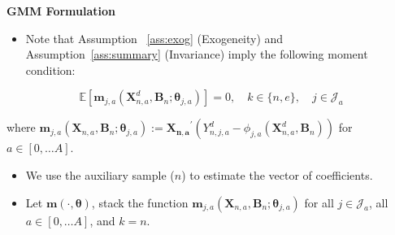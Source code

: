 \documentclass[static]{JJH-Beamer}
\begin{document}
\begin{frame}

\begin{center}
\textbf{GMM Formulation}
\end{center}

\begin{itemize}
\item Note that Assumption ~\ref{ass:exog} (Exogeneity) and Assumption~\ref{ass:summary} (Invariance) imply the following moment condition:
\end{itemize}

\begin{equation}
\mathbb{E} \left[ \bm{m}_{j,a} \left( \bm{X}_{n,a}^d, \bm{B}_{n}; \bm{\theta}_{j,a} \right) \right] = 0,  \quad k \in \{n,e\}, \quad j \in \mathcal{J}_a \label{eq:moment}
\end{equation}

\end{frame}

\begin{frame}

\noindent where $\bm{m}_{j,a} \left( \bm{X}_{n,a}, \bm{B}_{n} ; \bm{\theta}_{j,a} \right) := {\bm{X_{n,a}}}^{'} \left( Y_{n,j,a}^d -   \phi_{j,a} \left( \bm{X}_{n,a}^d, \bm{B}_{n} \right) \right)$ for $a \in [0, \ldots A]$.

\begin{itemize}
\item We use the auxiliary sample ($n$) to estimate the vector of coefficients.
\item Let $\bm{m} \left ( \cdot, \bm{\theta} \right)$, stack the function $\bm{m}_{j,a} \left( \bm{X}_{n,a}, \bm{B}_{n} ; \bm{\theta}_{j,a} \right)$  for all $j \in \mathcal{J}_a$, all $a \in [0, \ldots A]$, and $k = n$.
\end{itemize}

\end{frame}
\end{document}
